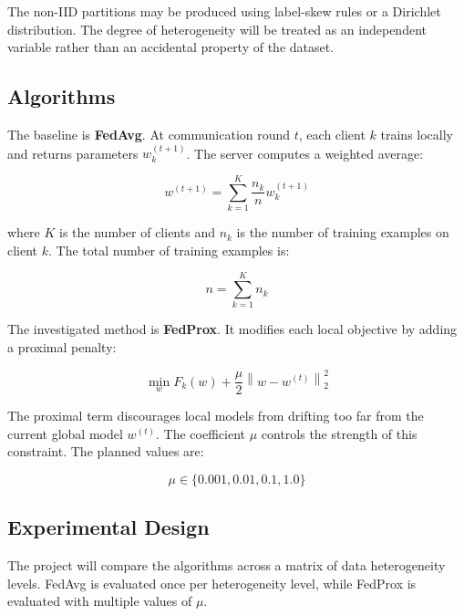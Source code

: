 \documentclass[11pt,a4paper]{article}
\begin{document}
The non-IID partitions may be produced using label-skew rules or a Dirichlet distribution. The degree of heterogeneity will be treated as an independent variable rather than an accidental property of the dataset.

\subsection{Algorithms}

The baseline is \textbf{FedAvg}. At communication round $t$, each client $k$ trains locally and returns parameters $w_k^{(t+1)}$. The server computes a weighted average:

\[
w^{(t+1)} = \sum_{k=1}^{K} \frac{n_k}{n} w_k^{(t+1)}
\]

where $K$ is the number of clients and $n_k$ is the number of training examples on client $k$. The total number of training examples is:

\[
n = \sum_{k=1}^{K} n_k
\]

The investigated method is \textbf{FedProx}. It modifies each local objective by adding a proximal penalty:

\[
\min_w F_k(w) + \frac{\mu}{2}\left\|w - w^{(t)}\right\|_2^2
\]

The proximal term discourages local models from drifting too far from the current global model $w^{(t)}$. The coefficient $\mu$ controls the strength of this constraint. The planned values are:

\[
\mu \in \{0.001, 0.01, 0.1, 1.0\}
\]

\subsection{Experimental Design}

The project will compare the algorithms across a matrix of data heterogeneity levels. FedAvg is evaluated once per heterogeneity level, while FedProx is evaluated with multiple values of $\mu$.
\end{document}

